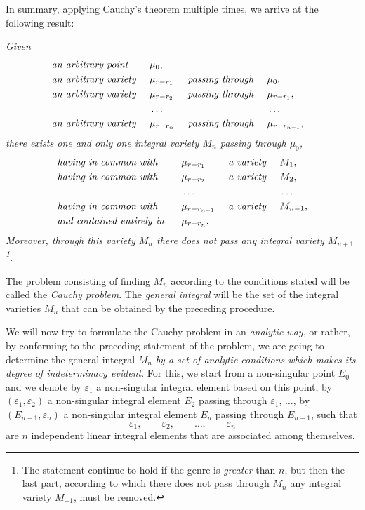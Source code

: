 \documentclass[leqno,11pt]{book}
\makeatletter
\theoremstyle{shape1}
\theoremstyle{shapesmall}
\let\old@epsilon\epsilon
\let\old@varepsilon\varepsilon
\let\epsilon\old@varepsilon
\let\varepsilon\old@epsilon
\newcommand{\somespace}{\vspace{9pt}}
\makeatother
\begin{document}
In summary, applying Cauchy's theorem multiple times, we arrive at the following result:

\somespace

\emph{Given}
\begin{alignat*}{8}
  &\text{\emph{an arbitrary point} }&&\mu_{0},\\
  &\text{\emph{an arbitrary variety} }&&\mu_{r-r_{1}}&&\text{\emph{ passing through} }&&\mu_{0},\\
  &\text{\emph{an arbitrary variety} }&&\mu_{r-r_{2}}&&\text{\emph{ passing through} }&&\mu_{r-r_{1}},\\
  &&&\dots&&&&\dots\\
  &\text{\emph{an arbitrary variety} }&&\mu_{r-r_{n}}&&\text{\emph{ passing through} }&&\mu_{r-r_{n-1}},
\end{alignat*}
\emph{there exists one and only one integral variety $M_{n}$ passing through $\mu_{0}$,}
\begin{alignat*}{8}
  &\text{\emph{having in common with } }&&\mu_{r-r_{1}}&&\text{\emph{ a variety} }&&M_{1},\\  
  &\text{\emph{having in common with } }&&\mu_{r-r_{2}}&&\text{\emph{ a variety} }&&M_{2},\\  
  &&&\dots&&&&\dots\\
  &\text{\emph{having in common with } }&&\mu_{r-r_{n-1}}&&\text{\emph{ a variety} }&&M_{n-1},\\
  &\text{\emph{and contained entirely in } }&&\mu_{r-r_{n}}.&&
\end{alignat*}
\emph{Moreover, through this variety $M_{n}$ there does not pass any integral variety $M_{n+1}$ \footnote{The statement continue to hold if the genre is \emph{greater} than $n$, but then the last part, according to which there does not pass through $M_{n}$ any integral variety $M_{+1}$, must be removed.}.}

\somespace

The problem consisting of finding $M_{n}$ according to the conditions stated will be called the \emph{Cauchy problem}. The \emph{general integral} will be the set of the integral varieties $M_{n}$ that can be obtained by the preceding procedure.

We will now try to formulate the Cauchy problem in an \emph{analytic way}, or rather, by conforming to the preceding statement of the problem, we are going to determine the general integral $M_{n}$ \emph{by a set of analytic conditions which makes its degree of indeterminacy evident}. For this, we start from a non-singular point $E_{0}$ and we denote by $\epsilon_{1}$ a non-singular integral element based on this point, by $(\epsilon_{1},\epsilon_{2})$ a non-singular integral element $E_{2}$ passing through $\epsilon_{1}$, $\dots$, by $(E_{n-1},\epsilon_{n})$ a non-singular integral element $E_{n}$ passing through $E_{n-1}$, such that
\[
\epsilon_{1},\qquad\epsilon_{2},\qquad\dots,\qquad\epsilon_{n}
\]
are $n$ independent linear integral elements that are associated among themselves.
\end{document}
